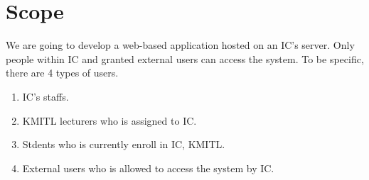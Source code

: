 \section{Scope}
We are going to develop a web-based application hosted on an IC's server.
Only people within IC and granted external users can access the system.
To be specific, there are 4 types of users.
\begin{enumerate}
\item IC's staffs.
\item KMITL lecturers who is assigned to IC.
\item Stdents who is currently enroll in IC, KMITL.
\item External users who is allowed to access the system by IC.
\end{enumerate}

